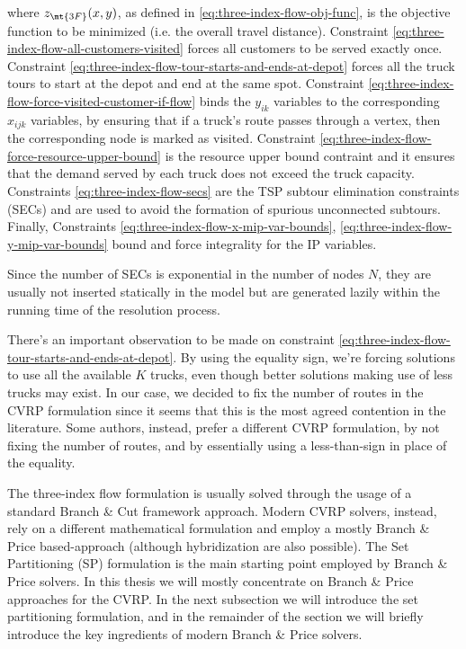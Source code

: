 where $z_\mt{3F}(x, y)$, as defined in \eqref{eq:three-index-flow-obj-func}, is the objective function to be minimized (i.e. the overall travel distance).
Constraint \eqref{eq:three-index-flow-all-customers-visited} forces all customers to be served exactly once.
Constraint \eqref{eq:three-index-flow-tour-starts-and-ends-at-depot} forces all the truck tours to start at the depot and end at the same spot.
Constraint \eqref{eq:three-index-flow-force-visited-customer-if-flow} binds the $y_{ik}$ variables to the corresponding $x_{ijk}$ variables, by ensuring that if a truck's route passes through a vertex, then the corresponding node is marked as visited.
Constraint \eqref{eq:three-index-flow-force-resource-upper-bound} is the resource upper bound contraint and it ensures that the demand served by each truck does not exceed the truck capacity.
Constraints \eqref{eq:three-index-flow-secs} are the TSP subtour elimination constraints (SECs) and are used to avoid the formation of spurious unconnected subtours.
Finally, Constraints \eqref{eq:three-index-flow-x-mip-var-bounds}, \eqref{eq:three-index-flow-y-mip-var-bounds} bound and force integrality for the IP variables.

Since the number of SECs is exponential in the number of nodes $N$, they are usually not inserted statically in the model but are generated lazily within the running time of the resolution process.

There's an important observation to be made on constraint \eqref{eq:three-index-flow-tour-starts-and-ends-at-depot}.
By using the equality sign, we're forcing solutions to use all the available $K$ trucks, even though better solutions making use of less trucks may exist.
In our case, we decided to fix the number of routes in the CVRP formulation since it seems that this is the most agreed contention in the literature.
Some authors, instead, prefer a different CVRP formulation, by not fixing the number of routes, and by essentially using a less-than-sign in place of the equality.


The three-index flow formulation is usually solved through the usage of a standard Branch \& Cut framework approach.
Modern CVRP solvers, instead, rely on a different mathematical formulation and employ a  mostly Branch \& Price based-approach (although hybridization are also possible).
The Set Partitioning (SP) formulation is the main starting point employed by Branch \& Price solvers.
In this thesis we will mostly concentrate on Branch \& Price approaches for the CVRP.
In the next subsection we will introduce the set partitioning formulation, and in the remainder of the section
we will briefly introduce the key ingredients of modern Branch \& Price solvers.



